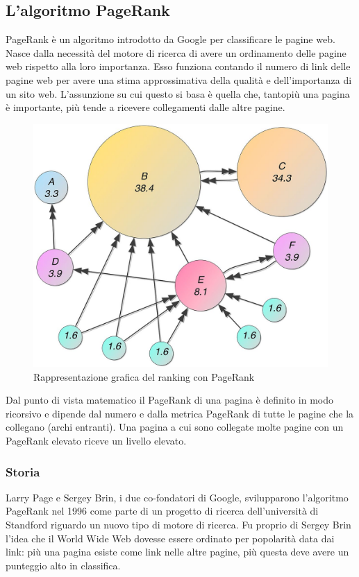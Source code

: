\documentclass[a4paper, 12pt]{article}
\begin{document}
\subsection{L'algoritmo PageRank}
PageRank \cite{Page98thepagerank} è un algoritmo introdotto da Google per classificare le pagine web. 
Nasce dalla necessità del motore di ricerca di avere un ordinamento delle pagine web rispetto alla loro importanza. Esso funziona contando il numero di link delle pagine web per avere una stima approssimativa della qualità e dell'importanza di un sito web. L'assunzione su cui questo si basa è quella che, tantopiù una pagina è importante, più tende a ricevere collegamenti dalle altre pagine.
\begin{figure}[H]
  \includegraphics[width=\linewidth]{images/pagerank.jpg}
  \caption{Rappresentazione grafica del ranking con PageRank}
\end{figure}
Dal punto di vista matematico il PageRank di una pagina è definito in modo ricorsivo e dipende dal numero e dalla metrica PageRank di tutte le pagine che la collegano (archi entranti). Una pagina a cui sono collegate molte pagine con un PageRank elevato riceve un livello elevato.
\subsubsection{Storia}
Larry Page e Sergey Brin, i due co-fondatori di Google, svilupparono l'algoritmo PageRank nel 1996 come parte di un progetto di ricerca dell'università di Standford riguardo un nuovo tipo di motore di ricerca. Fu proprio di Sergey Brin l'idea che il World Wide Web dovesse essere ordinato per popolarità data dai link: più una pagina esiste come link nelle altre pagine, più questa deve avere un punteggio alto in classifica.
\end{document}
